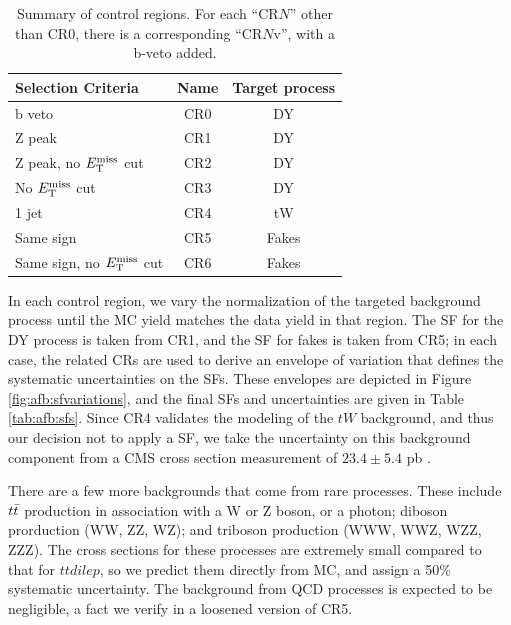 \begin{table}[h]
\begin{center}
\caption{Summary of control regions. For each ``CR$N$'' other than
  CR0, there is a corresponding ``CR$N$v'', with a b-veto added.}
\label{tab:afb:crdefs}
{\small
\begin{tabular}{l|c c}
\hline
Selection Criteria & Name & Target process  \\
\hline
b veto & CR0 & DY \\
\hline
Z peak & CR1 & DY \\
\hline
Z peak, no $E_\text{T}^\text{miss}$ cut & CR2 & DY \\
\hline
No $E_\text{T}^\text{miss}$ cut & CR3 & DY \\
\hline
1 jet & CR4 & tW  \\
\hline
Same sign & CR5 & Fakes \\
\hline
Same sign, no $E_\text{T}^\text{miss}$ cut & CR6 & Fakes \\
\hline
\end{tabular}
}
\end{center}
\end{table}

In each control region, we vary the normalization of the targeted
background process until the MC yield matches the data yield in that
region. The SF for the DY process is taken from CR1, and the SF for
fakes is taken from CR5; in each case, the related CRs are used to
derive an envelope of variation that defines the systematic
uncertainties on the SFs. These envelopes are depicted in Figure
\ref{fig:afb:sfvariations}, and the final SFs and uncertainties are
given in Table \ref{tab:afb:sfs}. Since CR4 validates the modeling of
the $tW$ background, and thus our decision not to apply a SF, we take
the uncertainty on this background component from a CMS cross section
measurement of $23.4 \pm 5.4$ pb \cite{twxsec}.

There are a few more backgrounds that come from rare processes. These
include $t\bar{t}$ production in association with a W or Z boson, or a
photon; diboson prorduction (WW, ZZ, WZ); and triboson production
(WWW, WWZ, WZZ, ZZZ). The cross sections for these processes are
extremely small compared to that for $ttdilep$, so we predict them
directly from MC, and assign a 50\% systematic uncertainty. The
background from QCD processes is expected to be negligible, a fact we
verify in a loosened version of CR5.

